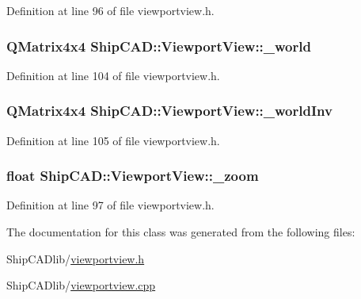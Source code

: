 Definition at line 96 of file viewportview.\-h.

\hypertarget{classShipCAD_1_1ViewportView_a1b2d9753e22af2e9a071e60799478905}{
\subsubsection[{\-\_\-world}]{\setlength{\rightskip}{0pt plus 5cm}Q\-Matrix4x4 Ship\-C\-A\-D\-::\-Viewport\-View\-::\-\_\-world\hspace{0.3cm}{\ttfamily [protected]}}}\label{classShipCAD_1_1ViewportView_a1b2d9753e22af2e9a071e60799478905}


Definition at line 104 of file viewportview.\-h.

\hypertarget{classShipCAD_1_1ViewportView_a6b16d2dd6a5c1b812e9fa96dfcadebbb}{
\subsubsection[{\-\_\-world\-Inv}]{\setlength{\rightskip}{0pt plus 5cm}Q\-Matrix4x4 Ship\-C\-A\-D\-::\-Viewport\-View\-::\-\_\-world\-Inv\hspace{0.3cm}{\ttfamily [protected]}}}\label{classShipCAD_1_1ViewportView_a6b16d2dd6a5c1b812e9fa96dfcadebbb}


Definition at line 105 of file viewportview.\-h.

\hypertarget{classShipCAD_1_1ViewportView_a337e90ffddd63535bad9b8de652a455a}{
\subsubsection[{\-\_\-zoom}]{\setlength{\rightskip}{0pt plus 5cm}float Ship\-C\-A\-D\-::\-Viewport\-View\-::\-\_\-zoom\hspace{0.3cm}{\ttfamily [protected]}}}\label{classShipCAD_1_1ViewportView_a337e90ffddd63535bad9b8de652a455a}


Definition at line 97 of file viewportview.\-h.



The documentation for this class was generated from the following files\-:\begin{DoxyCompactItemize}
\item 
Ship\-C\-A\-Dlib/\hyperlink{viewportview_8h}{viewportview.\-h}\item 
Ship\-C\-A\-Dlib/\hyperlink{viewportview_8cpp}{viewportview.\-cpp}\end{DoxyCompactItemize}
